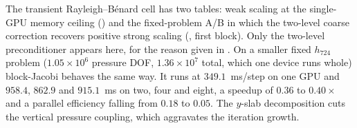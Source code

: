 The transient Rayleigh--B\'enard cell has two tables: weak scaling at the single-GPU memory
ceiling () and the fixed-problem A/B in which the two-level coarse
correction recovers positive strong scaling (, first block). Only
the two-level preconditioner appears here, for the reason given in
. On a smaller fixed $h_{724}$ problem
($1.05\times10^{6}$ pressure DOF, $1.36\times10^{7}$ total, which one device runs whole)
block-Jacobi behaves the same way. It runs at $349.1$~ms/step on one GPU and $958.4$,
$862.9$ and $915.1$~ms on two, four and eight, a speedup of $0.36$ to $0.40\times$ and a
parallel efficiency falling from $0.18$ to $0.05$. The $y$-slab decomposition cuts the
vertical pressure coupling, which aggravates the iteration growth.
